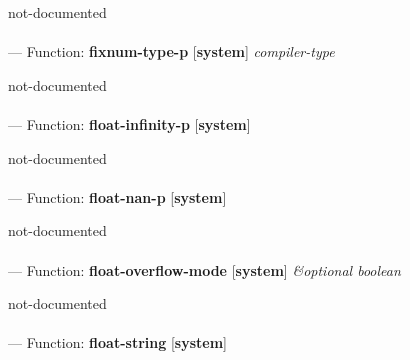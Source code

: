 \begin{adjustwidth}{5em}{5em}
not-documented
\end{adjustwidth}

\paragraph{}
\label{SYSTEM:FIXNUM-TYPE-P}
--- Function: \textbf{fixnum-type-p} [\textbf{system}] \textit{compiler-type}

\begin{adjustwidth}{5em}{5em}
not-documented
\end{adjustwidth}

\paragraph{}
\label{SYSTEM:FLOAT-INFINITY-P}
--- Function: \textbf{float-infinity-p} [\textbf{system}] \textit{}

\begin{adjustwidth}{5em}{5em}
not-documented
\end{adjustwidth}

\paragraph{}
\label{SYSTEM:FLOAT-NAN-P}
--- Function: \textbf{float-nan-p} [\textbf{system}] \textit{}

\begin{adjustwidth}{5em}{5em}
not-documented
\end{adjustwidth}

\paragraph{}
\label{SYSTEM:FLOAT-OVERFLOW-MODE}
--- Function: \textbf{float-overflow-mode} [\textbf{system}] \textit{\&optional boolean}

\begin{adjustwidth}{5em}{5em}
not-documented
\end{adjustwidth}

\paragraph{}
\label{SYSTEM:FLOAT-STRING}
--- Function: \textbf{float-string} [\textbf{system}] \textit{}

